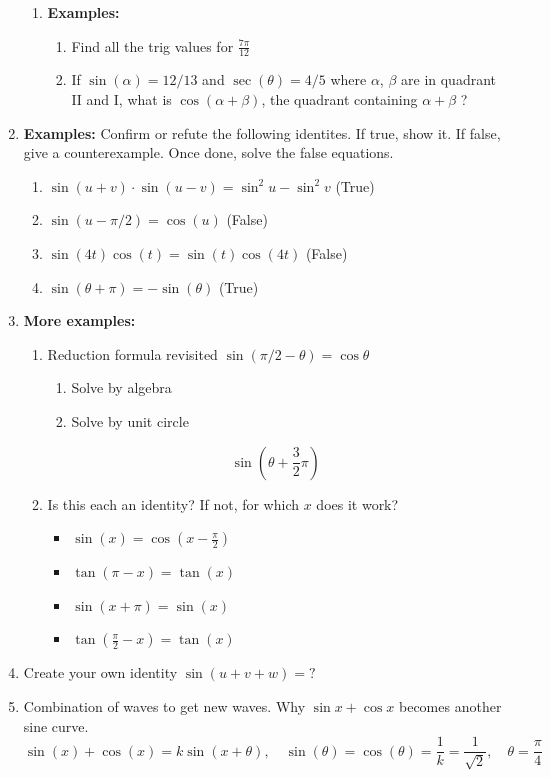 \documentclass{article}
\begin{document}
\begin{enumerate}
\begin{enumerate}
\item {\bf Examples:}
\begin{enumerate}
\item Find all the trig values for $\frac{7\pi}{12}$
\item If $\sin(\alpha) = 12/13$ and $\sec(\theta) = 4/5$ where $\alpha$, $\beta$ are in quadrant II and I, what is $\cos (\alpha+\beta)$, the quadrant containing $\alpha+\beta$ ?
\end{enumerate}
\end{enumerate}

\item {\bf Examples:} Confirm or refute the following identites. If true, show it. If false, give a counterexample. Once done, solve the false equations.
\begin{enumerate}
\item $\sin(u+v)\cdot\sin(u-v) = \sin^2u-\sin^2 v$ (True)
\item $\sin(u-\pi/2)=\cos(u)$ (False)
\item $\sin(4t)\cos(t)=\sin(t)\cos(4t)$ (False)
\item $\sin(\theta+\pi)=-\sin(\theta)$ (True)
\end{enumerate}

\item {\bf More examples:}
\begin{enumerate}
\item Reduction formula revisited $\sin(\pi/2-\theta) = \cos\theta$
\begin{enumerate}
\item Solve by algebra
\item Solve by unit circle
\end{enumerate}
$$
\sin (\theta+\frac{3}{2}\pi)
$$
\item Is this each an identity? If not, for which $x$ does it work?
\begin{itemize}
\item $\sin (x) = \cos (x-\frac{\pi}{2})$
\item $\tan(\pi-x) = \tan (x)$
\item $\sin(x+\pi) = \sin (x)$
\item $\tan(\frac{\pi}{2}-x) = \tan (x)$
\end{itemize}
\end{enumerate}
\item Create your own identity $\sin(u+v+w) = ?$
\item Combination of waves to get new waves. Why $\sin x +\cos x$ becomes another sine curve.
\[
\sin(x) +\cos(x) = k \sin(x+\theta), \quad \sin(\theta)=\cos(\theta)=\frac{1}{k} = \frac{1}{\sqrt{2}}, \quad \theta = \frac{\pi}{4}
\]
\end{enumerate}
\end{document}
